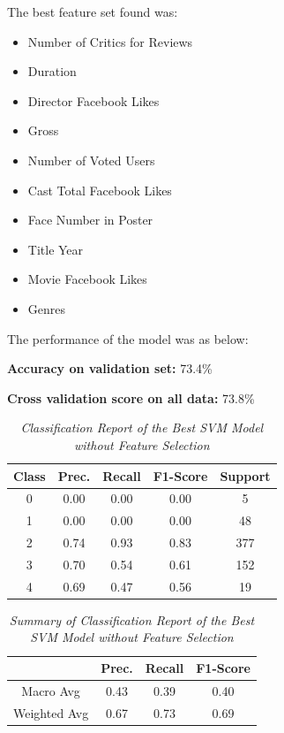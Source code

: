 \noindent
The best feature set found was:
\begin{itemize}
    \item Number of Critics for Reviews
    \item Duration
    \item Director Facebook Likes
    \item Gross
    \item Number of Voted Users
    \item Cast Total Facebook Likes
    \item Face Number in Poster
    \item Title Year
    \item Movie Facebook Likes
    \item Genres
\end{itemize}

\noindent
The performance of the model was as below:

\noindent
\textbf{Accuracy on validation set:} 73.4\%

\noindent
\textbf{Cross validation score on all data:} 73.8\%  

\begin{table}[!ht]
    \begin{center}
        \begin{tabular}{c|c|c|c|c}			
            \hline
            Class & Prec. & Recall & F1-Score & Support \\
            \hline\hline
            0 & 0.00 & 0.00 & 0.00 & 5 \\
            1 & 0.00 & 0.00 & 0.00 & 48 \\
            2 & 0.74 & 0.93 & 0.83 & 377 \\
            3 & 0.70 & 0.54 & 0.61 & 152 \\
            4 & 0.69 & 0.47 & 0.56 & 19\\
            \hline
        \end{tabular}

        \caption{\textit{Classification Report of the Best SVM Model without Feature Selection}}
        \label{svm-ft-report}
    \end{center}
\end{table}

\begin{table}[!ht]
    \begin{center}
        \begin{tabular}{c||c|c|c}			
            \hline
             & Prec. & Recall & F1-Score \\
             \hline\hline
            Macro Avg & 0.43 & 0.39 & 0.40 \\
            Weighted Avg & 0.67 & 0.73 & 0.69 \\
            \hline
        \end{tabular}

        \caption{\textit{Summary of Classification Report of the Best SVM Model without Feature Selection}}
        \label{svm-ft-report-sum}

    \end{center}
\end{table}

